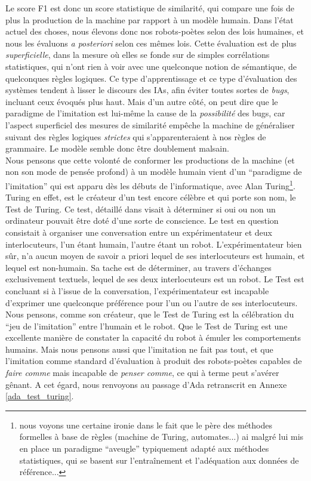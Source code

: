 \documentclass{article}
\begin{document}
					Le score F1 est donc un score statistique de similarité, qui compare une fois de plus la production de la machine par rapport à un modèle humain. Dans l'état actuel des choses, nous élevons donc nos robots-poètes selon des lois humaines, et nous les évaluons \textit{a posteriori} selon ces mêmes lois. Cette évaluation est de plus \textit{superficielle}, dans la mesure où elles se fonde sur de simples corrélations statistiques, qui n'ont rien à voir avec une quelconque notion de sémantique, de quelconques règles logiques. Ce type d'apprentissage et ce type d'évaluation des systèmes tendent à lisser le discours des IAs, afin éviter toutes sortes de \textit{bugs}, incluant ceux évoqués plus haut. Mais d'un autre côté, on peut dire que le paradigme de l'imitation est lui-même la cause de la \textit{possibilité} des bugs, car l'aspect superficiel des mesures de similarité empêche la machine de généraliser suivant des règles logiques \textit{strictes} qui s'apparenteraient à nos règles de grammaire. Le modèle semble donc être doublement malsain.\\
					
					Nous pensons que cette volonté de conformer les productions de la machine (et non son mode de pensée profond) à un modèle humain vient d'un ``paradigme de l'imitation'' qui est apparu dès les débuts de l'informatique, avec Alan Turing\footnote{nous voyons une certaine ironie dans le fait que le père des méthodes formelles à base de règles (machine de Turing, automates...) ai malgré lui mis en place un paradigme ``aveugle'' typiquement adapté aux méthodes statistiques, qui se basent sur l'entraînement et l'adéquation aux données de référence...}. Turing en effet, est le créateur d'un test encore célèbre et qui porte son nom, le Test de Turing. Ce test, détaillé dans \cite{turing1950} visait à déterminer si oui ou non un ordinateur pouvait être doté d'une sorte de conscience. Le test en question consistait à organiser une conversation entre un expérimentateur et deux interlocuteurs, l'un étant humain, l'autre étant un robot. L'expérimentateur bien sûr, n'a aucun moyen de savoir a priori lequel de ses interlocuteurs est humain, et lequel est non-humain. Sa tache est de déterminer, au travers d'échanges exclusivement textuels, lequel de ses deux interlocuteurs est un robot. Le Test est concluant si à l'issue de la conversation, l'expérimentateur est incapable d'exprimer une quelconque préférence pour l'un ou l'autre de ses interlocuteurs.\\
					
					Nous pensons, comme son créateur, que le Test de Turing est la célébration du ``jeu de l'imitation'' entre l'humain et le robot. Que le Test de Turing est une excellente manière de constater la capacité du robot à émuler les comportements humains. Mais nous pensons aussi que l'imitation ne fait pas tout, et que l'imitation comme standard d'évaluation à produit des robots-poètes capables de \textit{faire comme} mais incapable de \textit{penser comme}, ce qui à terme peut s'avérer gênant. A cet égard, nous renvoyons au passage d'Ada retranscrit en Annexe \ref{ada_test_turing}.\\
					
\end{document}
